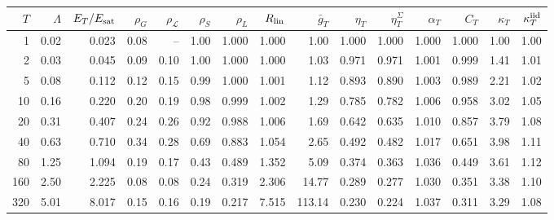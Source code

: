 \begin{tabular}{rrrrrrrrrrrrrrr}
\toprule
$T$ & $\Lambda$ & $E_T/E_{\rm sat}$ & $\rho_G$ & $\rho_{\mathcal L}$ & $\rho_S$ & $\rho_L$ & $R_{\rm lin}$ & $\bar g_T$ & $\eta_T$ & $\eta^\Sigma_T$ & $\alpha_T$ & $C_T$ & $\kappa_T$ & $\kappa^{\rm iid}_T$\\
\midrule
1 & 0.02 & 0.023 & 0.08 & -- & 1.00 & 1.000 & 1.000 & 1.00 & 1.000 & 1.000 & 1.000 & 1.000 & 1.00 & 1.00\\
2 & 0.03 & 0.045 & 0.09 & 0.10 & 1.00 & 1.000 & 1.000 & 1.03 & 0.971 & 0.971 & 1.001 & 0.999 & 1.41 & 1.01\\
5 & 0.08 & 0.112 & 0.12 & 0.15 & 0.99 & 1.000 & 1.001 & 1.12 & 0.893 & 0.890 & 1.003 & 0.989 & 2.21 & 1.02\\
10 & 0.16 & 0.220 & 0.20 & 0.19 & 0.98 & 0.999 & 1.002 & 1.29 & 0.785 & 0.782 & 1.006 & 0.958 & 3.02 & 1.05\\
20 & 0.31 & 0.407 & 0.24 & 0.26 & 0.92 & 0.988 & 1.006 & 1.69 & 0.642 & 0.635 & 1.010 & 0.857 & 3.79 & 1.08\\
40 & 0.63 & 0.710 & 0.34 & 0.28 & 0.69 & 0.883 & 1.054 & 2.65 & 0.492 & 0.482 & 1.017 & 0.651 & 3.98 & 1.11\\
80 & 1.25 & 1.094 & 0.19 & 0.17 & 0.43 & 0.489 & 1.352 & 5.09 & 0.374 & 0.363 & 1.036 & 0.449 & 3.61 & 1.12\\
160 & 2.50 & 2.225 & 0.08 & 0.08 & 0.24 & 0.319 & 2.306 & 14.77 & 0.289 & 0.277 & 1.030 & 0.351 & 3.38 & 1.10\\
320 & 5.01 & 8.017 & 0.15 & 0.16 & 0.19 & 0.217 & 7.515 & 113.14 & 0.230 & 0.224 & 1.037 & 0.311 & 3.29 & 1.08\\
\bottomrule
\end{tabular}

